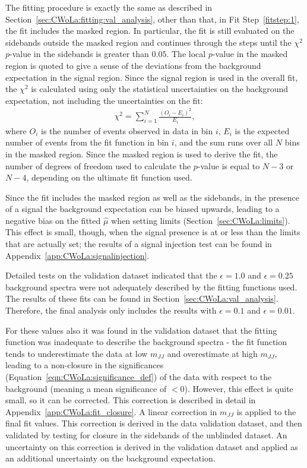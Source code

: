 The fitting procedure is exactly the same as described in Section~\ref{sec:CWoLa:fitting:val_analysis}, other than that, in Fit Step~\ref{fitstep:1}, the fit includes the masked region.
In particular, the fit is still evaluated on the sidebands outside the masked region and continues through the steps until the $\chi^2$ $p$-value in the sidebands is greater than $0.05$.
The local $p$-value in the masked region is quoted to give a sense of the deviations from the background expectation in the signal region.
Since the signal region is used in the overall fit, the $\chi^2$ is calculated using only the statistical uncertainties on the background expectation, not including the uncertainties on the fit:
\begin{align}
  \label{eqn:CWoLa:signal_chi2}
  \chi^2=\sum_{i=1}^N \frac{(O_i-E_i)^2}{E_i},
\end{align}
\noindent where $O_i$ is the number of events observed in data in bin $i$, $E_i$ is the expected number of events from the fit function in bin $i$, and the sum runs over all $N$ bins in the masked region.
Since the masked region is used to derive the fit, the number of degrees of freedom used to calculate the $p$-value is equal to $N-3$ or $N-4$, depending on the ultimate fit function used.

Since the fit includes the masked region as well as the sidebands, in the presence of a signal the background expectation can be biased upwards, leading to a negative bias on the fitted $\hat{\mu}$ when setting limits (Section~\ref{sec:CWoLa:limits}).
This effect is small, though, when the signal presence is at or less than the limits that are actually set; the results of a signal injection test can be found in Appendix~\ref{app:CWoLa:signalinjection}.

Detailed tests on the validation dataset indicated that the $\epsilon=1.0$ and $\epsilon=0.25$ background spectra were not adequately described by the fitting functions used.
The results of these fits can be found in Section~\ref{sec:CWoLa:val_analysis}.
Therefore, the final analysis only includes the results with $\epsilon=0.1$ and $\epsilon=0.01$.

For these values also it was found in the validation dataset that the fitting function was inadequate to describe the background spectra - the fit function tends to underestimate the data at low $m_{JJ}$ and overestimate at high $m_{JJ}$, leading to a non-closure in the significances (Equation~\ref{eqn:CWoLa:significance_def}) of the data with respect to the background (meaning a mean significance of $<0$).
However, this effect is quite small, so it can be corrected.
This correction is described in detail in Appendix~\ref{app:CWoLa:fit_closure}.
A linear correction in $m_{JJ}$ is applied to the final fit values.
This correction is derived in the data validation dataset, and then validated by testing for closure in the sidebands of the unblinded dataset.
An uncertainty on this correction is derived in the validation dataset and applied as an additional uncertainty on the background expectation.

